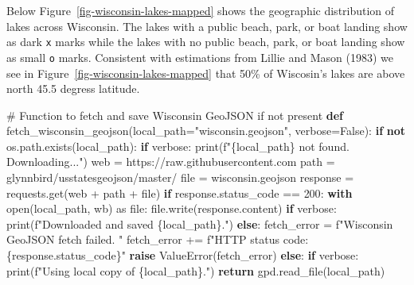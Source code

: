 \documentclass[
]{article}
\newenvironment{Shaded}{\begin{snugshade}}{\end{snugshade}}
\newcommand{\BuiltInTok}[1]{\textcolor[rgb]{0.00,0.23,0.31}{#1}}
\newcommand{\CommentTok}[1]{\textcolor[rgb]{0.37,0.37,0.37}{#1}}
\newcommand{\ControlFlowTok}[1]{\textcolor[rgb]{0.00,0.23,0.31}{\textbf{#1}}}
\newcommand{\DecValTok}[1]{\textcolor[rgb]{0.68,0.00,0.00}{#1}}
\newcommand{\ImportTok}[1]{\textcolor[rgb]{0.00,0.46,0.62}{#1}}
\newcommand{\KeywordTok}[1]{\textcolor[rgb]{0.00,0.23,0.31}{\textbf{#1}}}
\newcommand{\NormalTok}[1]{\textcolor[rgb]{0.00,0.23,0.31}{#1}}
\newcommand{\OperatorTok}[1]{\textcolor[rgb]{0.37,0.37,0.37}{#1}}
\newcommand{\PreprocessorTok}[1]{\textcolor[rgb]{0.68,0.00,0.00}{#1}}
\newcommand{\SpecialCharTok}[1]{\textcolor[rgb]{0.37,0.37,0.37}{#1}}
\newcommand{\SpecialStringTok}[1]{\textcolor[rgb]{0.13,0.47,0.30}{#1}}
\newcommand{\StringTok}[1]{\textcolor[rgb]{0.13,0.47,0.30}{#1}}
\newcommand{\VariableTok}[1]{\textcolor[rgb]{0.07,0.07,0.07}{#1}}
\begin{document}
Below Figure~\ref{fig-wisconsin-lakes-mapped} shows the geographic
distribution of lakes across Wisconsin. The lakes with a public beach,
park, or boat landing show as dark \texttt{x} marks while the lakes with
no public beach, park, or boat landing show as small \texttt{o} marks.
Consistent with estimations from Lillie and Mason (1983) we see in
Figure~\ref{fig-wisconsin-lakes-mapped} that 50\% of Wiscosin's lakes
are above north 45.5 degress latitude.

\begin{Shaded}
\begin{Highlighting}[]
\CommentTok{\# Function to fetch and save Wisconsin GeoJSON if not present}
\KeywordTok{def}\NormalTok{ fetch\_wisconsin\_geojson(local\_path}\OperatorTok{=}\StringTok{"wisconsin.geojson"}\NormalTok{, verbose}\OperatorTok{=}\VariableTok{False}\NormalTok{):}
    \ControlFlowTok{if} \KeywordTok{not}\NormalTok{ os.path.exists(local\_path):}
        \ControlFlowTok{if}\NormalTok{ verbose: }\BuiltInTok{print}\NormalTok{(}\SpecialStringTok{f"}\SpecialCharTok{\{}\NormalTok{local\_path}\SpecialCharTok{\}}\SpecialStringTok{ not found. Downloading..."}\NormalTok{)}
\NormalTok{        web }\OperatorTok{=} \StringTok{\textquotesingle{}https://raw.githubusercontent.com\textquotesingle{}}
\NormalTok{        path }\OperatorTok{=} \StringTok{\textquotesingle{}glynnbird/usstatesgeojson/master/\textquotesingle{}}
        \BuiltInTok{file} \OperatorTok{=} \StringTok{\textquotesingle{}wisconsin.geojson\textquotesingle{}}
\NormalTok{        response }\OperatorTok{=}\NormalTok{ requests.get(web }\OperatorTok{+}\NormalTok{ path }\OperatorTok{+} \BuiltInTok{file}\NormalTok{)}
        \ControlFlowTok{if}\NormalTok{ response.status\_code }\OperatorTok{==} \DecValTok{200}\NormalTok{:}
            \ControlFlowTok{with} \BuiltInTok{open}\NormalTok{(local\_path, }\StringTok{\textquotesingle{}wb\textquotesingle{}}\NormalTok{) }\ImportTok{as} \BuiltInTok{file}\NormalTok{:}
                \BuiltInTok{file}\NormalTok{.write(response.content)}
            \ControlFlowTok{if}\NormalTok{ verbose: }\BuiltInTok{print}\NormalTok{(}\SpecialStringTok{f"Downloaded and saved }\SpecialCharTok{\{}\NormalTok{local\_path}\SpecialCharTok{\}}\SpecialStringTok{."}\NormalTok{)}
        \ControlFlowTok{else}\NormalTok{:}
\NormalTok{            fetch\_error }\OperatorTok{=} \SpecialStringTok{f"Wisconsin GeoJSON fetch failed. "}
\NormalTok{            fetch\_error }\OperatorTok{+=} \SpecialStringTok{f"HTTP status code: }\SpecialCharTok{\{}\NormalTok{response}\SpecialCharTok{.}\NormalTok{status\_code}\SpecialCharTok{\}}\SpecialStringTok{"}
            \ControlFlowTok{raise} \PreprocessorTok{ValueError}\NormalTok{(fetch\_error)}
    \ControlFlowTok{else}\NormalTok{:}
        \ControlFlowTok{if}\NormalTok{ verbose: }\BuiltInTok{print}\NormalTok{(}\SpecialStringTok{f"Using local copy of }\SpecialCharTok{\{}\NormalTok{local\_path}\SpecialCharTok{\}}\SpecialStringTok{."}\NormalTok{)}
    \ControlFlowTok{return}\NormalTok{ gpd.read\_file(local\_path)}


\end{Highlighting}
\end{Shaded}
\end{document}
